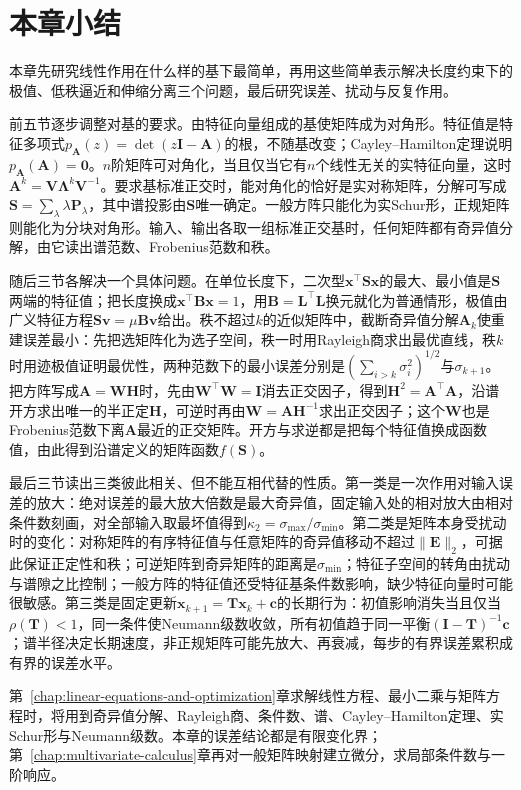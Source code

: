 
\section{本章小结}
\label{sec:ls-analysis-summary}
\label{sec:linear-algebra-summary}
\label{sec:matrix-analysis-summary}

本章先研究线性作用在什么样的基下最简单，再用这些简单表示解决长度约束下的极值、低秩逼近和伸缩分离三个问题，最后研究误差、扰动与反复作用。

前五节逐步调整对基的要求。由特征向量组成的基使矩阵成为对角形。特征值是特征多项式$p_{\bm A}(z)=\det(z\bm I-\bm A)$的根，不随基改变；Cayley--Hamilton定理说明$p_{\bm A}(\bm A)=\bm0$。$n$阶矩阵可对角化，当且仅当它有$n$个线性无关的实特征向量，这时$\bm A^k=\bm V\bm\Lambda^k\bm V^{-1}$。要求基标准正交时，能对角化的恰好是实对称矩阵，分解可写成$\bm S=\sum_\lambda\lambda\bm P_\lambda$，其中谱投影由$\bm S$唯一确定。一般方阵只能化为实Schur形，正规矩阵则能化为分块对角形。输入、输出各取一组标准正交基时，任何矩阵都有奇异值分解，由它读出谱范数、Frobenius范数和秩。

随后三节各解决一个具体问题。在单位长度下，二次型$\bm x^\top\bm S\bm x$的最大、最小值是$\bm S$两端的特征值；把长度换成$\bm x^\top\bm B\bm x=1$，用$\bm B=\bm L^\top\bm L$换元就化为普通情形，极值由广义特征方程$\bm S\bm v=\mu\bm B\bm v$给出。秩不超过$k$的近似矩阵中，截断奇异值分解$\bm A_k$使重建误差最小：先把选矩阵化为选子空间，秩一时用Rayleigh商求出最优直线，秩$k$时用迹极值证明最优性，两种范数下的最小误差分别是$(\sum_{i>k}\sigma_i^2)^{1/2}$与$\sigma_{k+1}$。把方阵写成$\bm A=\bm W\bm H$时，先由$\bm W^\top\bm W=\bm I$消去正交因子，得到$\bm H^2=\bm A^\top\bm A$，沿谱开方求出唯一的半正定$\bm H$，可逆时再由$\bm W=\bm A\bm H^{-1}$求出正交因子；这个$\bm W$也是Frobenius范数下离$\bm A$最近的正交矩阵。开方与求逆都是把每个特征值换成函数值，由此得到沿谱定义的矩阵函数$f(\bm S)$。

最后三节读出三类彼此相关、但不能互相代替的性质。第一类是一次作用对输入误差的放大：绝对误差的最大放大倍数是最大奇异值，固定输入处的相对放大由相对条件数刻画，对全部输入取最坏值得到$\kappa_2=\sigma_{\max}/\sigma_{\min}$。第二类是矩阵本身受扰动时的变化：对称矩阵的有序特征值与任意矩阵的奇异值移动不超过$\lVert\bm E\rVert_2$，可据此保证正定性和秩；可逆矩阵到奇异矩阵的距离是$\sigma_{\min}$；特征子空间的转角由扰动与谱隙之比控制；一般方阵的特征值还受特征基条件数影响，缺少特征向量时可能很敏感。第三类是固定更新$\bm x_{k+1}=\bm T\bm x_k+\bm c$的长期行为：初值影响消失当且仅当$\rho(\bm T)<1$，同一条件使Neumann级数收敛，所有初值趋于同一平衡$(\bm I-\bm T)^{-1}\bm c$；谱半径决定长期速度，非正规矩阵可能先放大、再衰减，每步的有界误差累积成有界的误差水平。

第~\ref{chap:linear-equations-and-optimization}章求解线性方程、最小二乘与矩阵方程时，将用到奇异值分解、Rayleigh商、条件数、谱、Cayley--Hamilton定理、实Schur形与Neumann级数。本章的误差结论都是有限变化界；第~\ref{chap:multivariate-calculus}章再对一般矩阵映射建立微分，求局部条件数与一阶响应。
